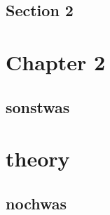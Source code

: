 \documentclass{book}
\begin{document}
\section[section2]{Section 2}
\lipsum[4-7]




\chapter[chapter2]{Chapter 2}
\section[section3]{sonstwas}


\chapter[theory]{theory}
\section[section3]{nochwas}

\end{document}
